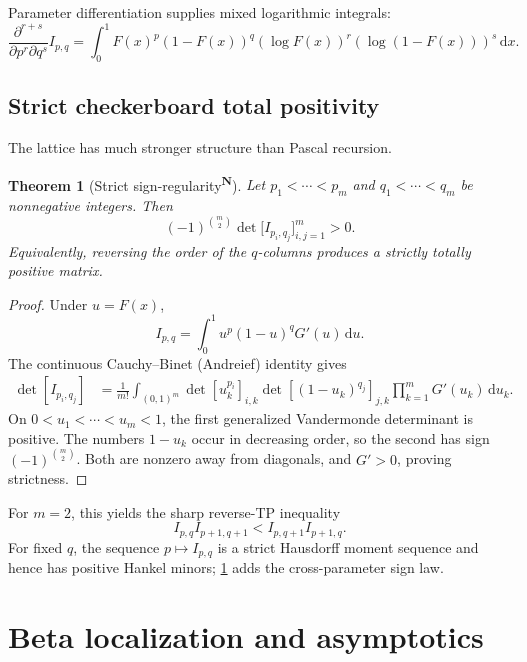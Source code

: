 \documentclass[11pt,oneside]{article}
\newtheorem{theorem}{Theorem}[section]
\theoremstyle{definition}
\theoremstyle{remark}
\newcommand{\F}{F}
\newcommand{\G}{G}
\newcommand{\dd}{\,\mathrm d}
\newcommand{\tagnew}{\textsuperscript{\textcolor{oliveink}{\bfseries N}}}
\begin{document}
Parameter differentiation supplies mixed logarithmic integrals:
\begin{equation}\label{eq:paramdiff}
 \frac{\partial^{r+s}}{\partial p^r\partial q^s}I_{p,q}
 =\int_0^1\F(x)^p(1-\F(x))^q
 (\log\F(x))^r(\log(1-\F(x)))^s\dd x.
\end{equation}

\subsection{Strict checkerboard total positivity}

The lattice has much stronger structure than Pascal recursion.

\begin{theorem}[Strict sign-regularity\tagnew]\label{thm:signregular}
Let \(p_1<\cdots<p_m\) and \(q_1<\cdots<q_m\) be nonnegative integers.  Then
\begin{equation}\label{eq:signregular}
 (-1)^{\binom m2}
 \det\bigl[I_{p_i,q_j}\bigr]_{i,j=1}^m>0.
\end{equation}
Equivalently, reversing the order of the \(q\)-columns produces a strictly
totally positive matrix.
\end{theorem}

\begin{proof}
Under \(u=\F(x)\),
\[
 I_{p,q}=\int_0^1u^p(1-u)^q\G'(u)\dd u.
\]
The continuous Cauchy--Binet (Andreief) identity gives
\begin{align*}
 \det[I_{p_i,q_j}]
 &=\frac1{m!}\int_{(0,1)^m}
 \det[u_k^{p_i}]_{i,k}
 \det[(1-u_k)^{q_j}]_{j,k}
 \prod_{k=1}^m\G'(u_k)\dd u_k.
\end{align*}
On \(0<u_1<\cdots<u_m<1\), the first generalized Vandermonde determinant is
positive.  The numbers \(1-u_k\) occur in decreasing order, so the second has
sign \((-1)^{\binom m2}\).  Both are nonzero away from diagonals, and
\(\G'>0\), proving strictness.
\end{proof}

For \(m=2\), this yields the sharp reverse-TP inequality
\begin{equation}\label{eq:TP2}
 I_{p,q}I_{p+1,q+1}
 <I_{p,q+1}I_{p+1,q}.
\end{equation}
For fixed \(q\), the sequence \(p\mapsto I_{p,q}\) is a strict Hausdorff moment
sequence and hence has positive Hankel minors; \cref{thm:signregular} adds the
cross-parameter sign law.

\section{Beta localization and asymptotics}
\end{document}

